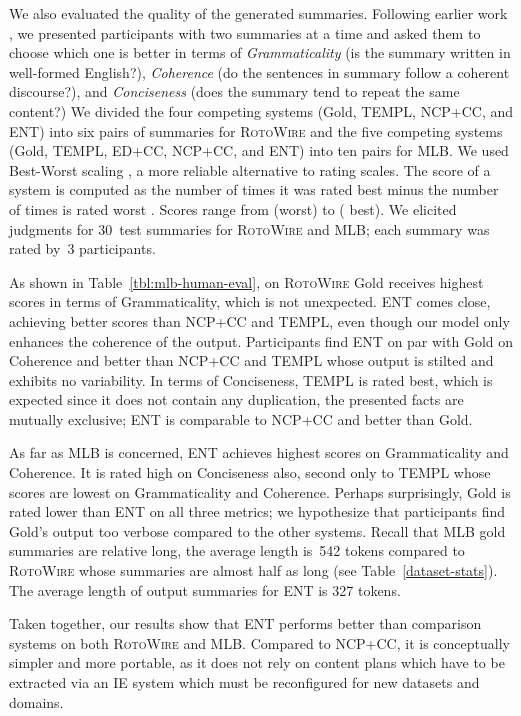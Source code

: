 \documentclass[11pt,a4paper]{article}
\begin{document}
We also evaluated the quality of the generated summaries.  Following
earlier work \cite{DBLP:journals/corr/abs-1809-00582}, we presented
participants with two summaries at a time and asked them to choose
which one is better in terms of \emph{Grammaticality} (is the summary
written in well-formed English?), \emph{Coherence} (do the sentences
in summary follow a coherent discourse?), and \emph{Conciseness} (does
the summary tend to repeat the same content?)  We divided the four
competing systems (Gold, TEMPL, NCP+CC, and ENT) into six pairs
of summaries for \textsc{RotoWire} and the five
competing systems (Gold, TEMPL, ED+CC, NCP+CC, and ENT) into ten pairs
for MLB.
We used Best-Worst scaling \cite{louviere1991best,
  louviere2015best}, a more reliable alternative to rating scales.
The score of a system is computed as the number of times it was rated
best minus the number of times is rated worst \cite{orme2009maxdiff}.
Scores range from  (worst) to  (
best). We elicited judgments for 30~test summaries for
  \textsc{RotoWire} and MLB; each summary was rated by~3
  participants.


As shown in Table~\ref{tbl:mlb-human-eval}, on \textsc{RotoWire} Gold
receives highest scores in terms of Grammaticality, which is not
unexpected.  ENT comes close, achieving better scores than NCP+CC and
TEMPL, even though our model only enhances the coherence of the
output. Participants find ENT on par with Gold on Coherence and better
than NCP+CC and TEMPL whose output is stilted and exhibits no
variability.  In terms of Conciseness, TEMPL is rated best, which is
expected since it does not contain any duplication, the presented
facts are mutually exclusive; ENT is comparable to NCP+CC and better
than Gold. 


As far as MLB is concerned, ENT achieves highest scores on
Grammaticality and Coherence. It is rated high on Conciseness also,
second only to TEMPL whose scores are lowest on Grammaticality and
Coherence.  Perhaps surprisingly, Gold is rated lower than ENT on all
three metrics; we hypothesize that participants find Gold's output too
verbose compared to the other systems. Recall that MLB gold summaries
are relative long, the average length is~542 tokens compared to
\textsc{RotoWire} whose summaries are almost half as long (see
Table~\ref{dataset-stats}). The average length of 
output summaries for ENT is 327 tokens. 

Taken together, our results show that ENT performs better than
comparison systems on both \textsc{RotoWire} and MLB. Compared to
NCP+CC, it is conceptually simpler and more portable, as it does not
rely on content plans which have to be extracted via an IE system
which must be reconfigured for new datasets and domains.
\end{document}
